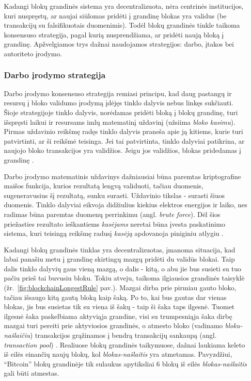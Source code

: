 Kadangi blokų grandinės sistema yra decentralizuota, nėra centrinės institucijos, kuri nuspręstų, ar naujai siūlomas pridėti į grandinę blokas
yra validus (be transakcijų su falsifikuotais duomenimis). Todėl blokų grandinės tinkle taikoma konsensuso strategija,
pagal kurią nusprendžiama, ar pridėti naują bloką į grandinę. Apžvelgiamos trys dažnai naudojamos strategijos: darbo, įtakos bei autoriteto įrodymo.

\subsubsection{Darbo įrodymo strategija}

Darbo įrodymo konsensuso strategija remiasi principu, kad daug pastangų ir resursų į bloko validumo įrodymą įdėjęs tinklo
dalyvis nebus linkęs sukčiauti. Šioje strategijoje tinklo dalyvis, norėdamas pridėti bloką į blokų grandinę, turi išspręsti laikui ir resursams
imlų matematinį
uždavinį (užsiima \textit{bloko kasimu}). Pirmas uždavinio reikšmę radęs tinklo dalyvis praneša apie ją kitiems, kurie turi patvirtinti,
ar ši reikšmė teisinga. Jei tai patvirtinta, tinklo dalyviai patikrina, ar naujojo bloko transakcijos yra validžios. Jeigu jos validžios,
blokas pridedamas į grandinę \cite{Zheng2017}.

Darbo įrodymo matematinis uždavinys dažniausiai būna paremtas kriptografine maišos funkcija, kurios rezultatą lengvą validuoti,
tačiau duomenis, sugeneravusius šį rezultatą, sunku surasti. Uždavinio tikslas - surasti šiuos duomenis. Tinklo dalyviai eikvoja didžiulius
kiekius elektros energijos ir laiko,
nes radimas būna paremtas duomenų perrinkimu (angl. \textit{brute force}). Dėl šios priežasties rezultato ieškantiems \textit{kasėjams}
 neretai būna įvesta paskatinimo sistema, kuri teisingą reikšmę radusį
\textit{kasėją} apdovanoja piniginiu atlygiu \cite{SatoshiNakamoto}. 

Kadangi blokų grandinės tinklas yra decentralizuotas, įmanoma situacija, kad labai panašiu metu į grandinę skirtingų mazgų pridėti du validūs blokai.
Taip dalis tinklo dalyvių gaus vieną mazgą, o dalis - kitą, o abu jie bus susieti su tuo pačiu prieš tai buvusiu bloku.
Tokiu atveju, taikoma ilgiausios grandinės taisyklė (žr.\hypertarget{fig:blockchainLongestRule}{~\ref{fig:blockchainLongestRule}} pav.). Mazgai dirba prie pirmiau gauto bloko,
tačiau išsaugo kitą gautą bloką kaip šaką. Po to, kai bus gautas dar vienas blokas, jis bus susietas tik su viena iš šakų - taip ši šaka taps ilgesnė. Tuomet
ilgesnė šaka paskelbiama aktyviąja grandine, visi su trumpesniąja šaka dirbę mazgai turi pereiti prie aktyviosios grandinės, o atmesto bloko (vadinamo \textit{bloku-našlaičiu}) transakcijos
grąžinamos į bendrą transakcijų sankaupą (angl. \textit{transaction pool}) \cite{SatoshiNakamoto}.
Realiuose blokų grandinės taikymuose, dažnai laukiama keleto iš eilės einančių naujų blokų, kol \textit{blokas-našlaitis}
yra atmetamas. Pavyzdžiui,
\enquote{Bitcoin} blokų grandinėje tik sulaukus apytiksliai 6 blokų iš eilės \textit{blokas-našlaitis} gali būti atmestas\cite{Zheng2017}.

